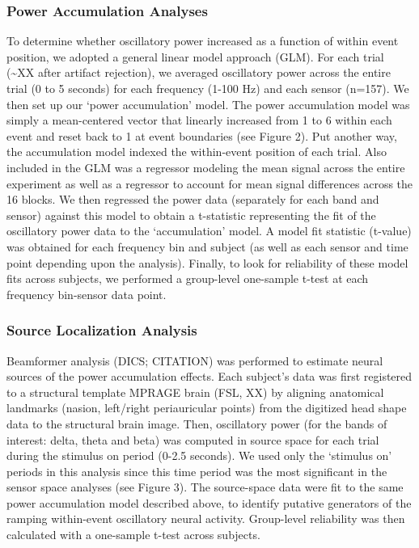 \subsubsection{Power Accumulation
Analyses}\label{power-accumulation-analyses}

To determine whether oscillatory power increased as a function of within
event position, we adopted a general linear model approach (GLM). For
each trial (\textasciitilde{}XX after artifact rejection), we averaged
oscillatory power across the entire trial (0 to 5 seconds) for each
frequency (1-100 Hz) and each sensor (n=157). We then set up our `power
accumulation' model. The power accumulation model was simply a
mean-centered vector that linearly increased from 1 to 6 within each
event and reset back to 1 at event boundaries (see Figure 2). Put
another way, the accumulation model indexed the within-event position of
each trial. Also included in the GLM was a regressor modeling the mean
signal across the entire experiment as well as a regressor to account
for mean signal differences across the 16 blocks. We then regressed the
power data (separately for each band and sensor) against this model to
obtain a t-statistic representing the fit of the oscillatory power data
to the `accumulation' model. A model fit statistic (t-value) was
obtained for each frequency bin and subject (as well as each sensor and
time point depending upon the analysis). Finally, to look for
reliability of these model fits across subjects, we performed a
group-level one-sample t-test at each frequency bin-sensor data point.

\subsubsection{Source Localization
Analysis}\label{source-localization-analysis}

Beamformer analysis (DICS; CITATION) was performed to estimate neural
sources of the power accumulation effects. Each subject's data was first
registered to a structural template MPRAGE brain (FSL, XX) by aligning
anatomical landmarks (nasion, left/right periauricular points) from the
digitized head shape data to the structural brain image. Then,
oscillatory power (for the bands of interest: delta, theta and beta) was
computed in source space for each trial during the stimulus on period
(0-2.5 seconds). We used only the `stimulus on' periods in this analysis
since this time period was the most significant in the sensor space
analyses (see Figure 3). The source-space data were fit to the same
power accumulation model described above, to identify putative
generators of the ramping within-event oscillatory neural activity.
Group-level reliability was then calculated with a one-sample t-test
across subjects.

